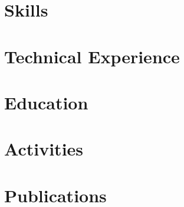 \documentclass[letter,10pt]{article}
\begin{document}
\thispagestyle{firstpage}



\section{Skills}


\section{Technical Experience}


\section{Education}



\section{Activities}


\section{Publications}

\end{document}
